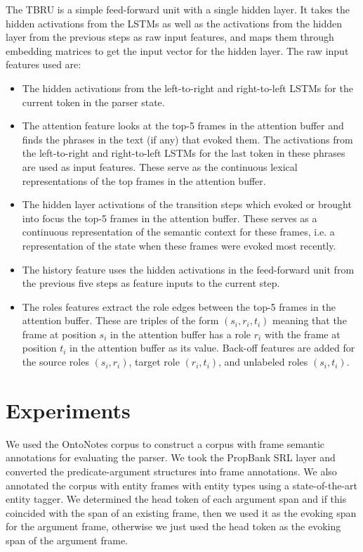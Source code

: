 \documentclass[11pt,a4paper]{article}
\begin{document}
The TBRU is a simple feed-forward unit with a single hidden layer.
It takes the hidden activations from the LSTMs as well as the activations from
the hidden layer from the previous steps as raw input features, and maps them
through embedding matrices to get the input vector for the  hidden layer. The
raw input features used are:

\begin{itemize}
  \item The hidden activations from the left-to-right and right-to-left LSTMs
  for the current token in the parser state.
  \item The attention feature looks at the top-5 frames in the attention buffer
  and finds the phrases in the text (if any) that evoked them. The activations
  from the left-to-right and right-to-left LSTMs for the last token in these
  phrases are used as input features. These serve as the continuous lexical
  representations of the top frames in the attention buffer.
  \item The hidden layer activations of the transition steps which evoked or
  brought into focus the top-5 frames in the attention buffer. These serves as a
  continuous representation of the semantic context for these frames, i.e. a
  representation of the state when these frames were evoked most recently.
  \item The history feature uses the hidden activations in the feed-forward
  unit from the previous five steps as feature inputs to the current step.
  \item The roles features extract the role edges between the top-5 frames in
  the attention buffer. These are triples of the form $(s_i, r_i, t_i)$ meaning
  that the frame at position $s_i$ in the attention buffer has a role $r_i$ with
  the frame at position $t_i$ in the attention buffer as its value. Back-off
  features are added for the source roles $(s_i,r_i)$, target role $(r_i, t_i)$,
  and unlabeled roles $(s_i,t_i)$.
\end{itemize}

\section{Experiments}

We used the OntoNotes corpus \cite{ontonotes2006} to construct a corpus
with frame semantic annotations for evaluating the parser. We took the
PropBank SRL layer \cite{palmer2005} and converted the predicate-argument
structures into frame annotations. We also annotated the corpus with
entity frames with entity types using a state-of-the-art entity tagger.
We determined the head token of each argument span and if this coincided
with the span of an existing frame, then we used it as the evoking span for the
argument frame, otherwise we just used the head token as the evoking span of the
argument frame.
\end{document}
